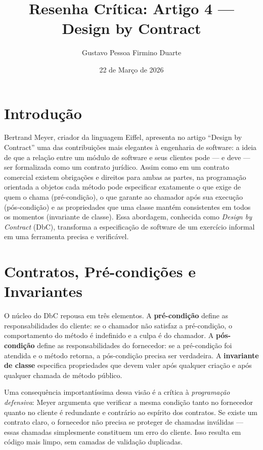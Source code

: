 \documentclass[12pt,a4paper]{article}
\title{Resenha Cr\'itica: Artigo 4 ---\\
Design by Contract}
\author{Gustavo Pessoa Firmino Duarte}
\date{22 de Mar\c{c}o de 2026}
\begin{document}
\maketitle

\section{Introdu\c{c}\~ao}

Bertrand Meyer, criador da linguagem Eiffel, apresenta no artigo ``Design by
Contract'' uma das contribui\c{c}\~oes mais elegantes \`a engenharia de software:
a ideia de que a rela\c{c}\~ao entre um m\'odulo de software e seus clientes pode
--- e deve --- ser formalizada como um contrato jur\'idico. Assim como em um
contrato comercial existem obriga\c{c}\~oes e direitos para ambas as partes, na
programa\c{c}\~ao orientada a objetos cada m\'etodo pode especificar exatamente o
que exige de quem o chama (pr\'e-condi\c{c}\~ao), o que garante ao chamador ap\'os
sua execu\c{c}\~ao (p\'os-condi\c{c}\~ao) e as propriedades que uma classe mant\'em
consistentes em todos os momentos (invariante de classe). Essa abordagem, conhecida
como \textit{Design by Contract} (DbC), transforma a especifica\c{c}\~ao de
software de um exerc\'icio informal em uma ferramenta precisa e verific\'avel.

\section{Contratos, Pr\'e-condi\c{c}\~oes e Invariantes}

O n\'ucleo do DbC repousa em tr\^es elementos. A \textbf{pr\'e-condi\c{c}\~ao}
define as responsabilidades do cliente: se o chamador n\~ao satisfaz a
pr\'e-condi\c{c}\~ao, o comportamento do m\'etodo \'e indefinido e a culpa \'e
do chamador. A \textbf{p\'os-condi\c{c}\~ao} define as responsabilidades do
fornecedor: se a pr\'e-condi\c{c}\~ao foi atendida e o m\'etodo retorna, a
p\'os-condi\c{c}\~ao precisa ser verdadeira. A \textbf{invariante de classe}
especifica propriedades que devem valer ap\'os qualquer cria\c{c}\~ao e ap\'os
qualquer chamada de m\'etodo p\'ublico.

Uma consequ\^encia important\'issima dessa vis\~ao \'e a cr\'itica \`a
\textit{programa\c{c}\~ao defensiva}: Meyer argumenta que verificar a mesma
condi\c{c}\~ao tanto no fornecedor quanto no cliente \'e redundante e contr\'ario
ao esp\'irito dos contratos. Se existe um contrato claro, o fornecedor n\~ao
precisa se proteger de chamadas inv\'alidas --- essas chamadas simplesmente
constituem um erro do cliente. Isso resulta em c\'odigo mais limpo, sem camadas
de valida\c{c}\~ao duplicadas.
\end{document}
